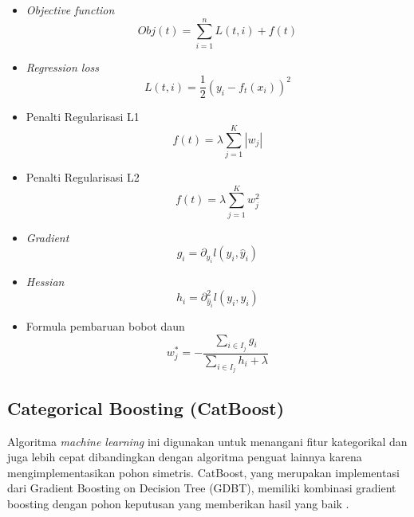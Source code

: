 \documentclass[conference]{IEEEtran}
\begin{document}
\begin{itemize}
    \item \textit{Objective function} 
        \begin{equation}
            Obj(t) = \sum_{i=1}^n L(t, i) + f(t)
        \end{equation}
    \item \textit{Regression loss} 
        \begin{equation}
            L(t, i) = \frac{1}{2} \left(y_i - f_t(x_i)\right)^2
        \end{equation}
    \item Penalti Regularisasi L1
        \begin{equation}
            f(t) = \lambda \sum_{j=1}^K |w_j|
        \end{equation}
    \item Penalti Regularisasi L2
        \begin{equation}
            f(t) = \lambda \sum_{j=1}^K w_j^2
        \end{equation}
    \item \textit{Gradient} 
        \begin{equation}
            g_{i}=\partial_{\hat{y}_{i}}l(y_{i},\hat{y}_{i})
        \end{equation}
    \item \textit{Hessian} 
        \begin{equation}
            h_{i}=\partial_{\hat{y}_{i}}^{2}l(y_{i},\hat{y}_{i})
        \end{equation}
    \item Formula pembaruan bobot daun
        \begin{equation}
            w_{j}^{*}=-\frac{\sum_{i\in I_{j}}g_{i}}{\sum_{i\in I_{j}}h_{i}+\lambda}
        \end{equation}
\end{itemize}

\subsection{Categorical Boosting (CatBoost)}

Algoritma \textit{machine learning} ini digunakan untuk menangani fitur kategorikal dan juga lebih cepat dibandingkan 
dengan algoritma penguat lainnya karena mengimplementasikan pohon simetris. CatBoost, yang merupakan implementasi dari Gradient Boosting on Decision Tree (GDBT), 
memiliki kombinasi gradient boosting dengan pohon keputusan yang memberikan hasil yang baik \cite{b28}.
\end{document}
